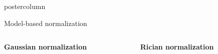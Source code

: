 \documentclass[final, size=a0]{beamer}
\begin{document}
\begin{frame}
\begin{columns}
\begin{column}{.33\textwidth}
\begin{beamercolorbox}[center,wd=\textwidth]{postercolumn}
\begin{minipage}[T]{.95\textwidth}
{\begin{alertblock}{Model-based normalization}
              \vspace{-.5cm}

              \begin{columns}
                \begin{column}{.5\textwidth}
                  
                  \begin{center}
                    \textbf{Gaussian normalization}
                  \end{center}

                \end{column}
                \begin{column}{.5\textwidth}
                  \begin{center}
                    \textbf{Rician normalization}
                  \end{center}
                \end{column}
              \end{columns}

              \vspace{1cm}


\end{alertblock}}
\end{minipage}
\end{beamercolorbox}
\end{column}
\end{columns}
\end{frame}
\end{document}
